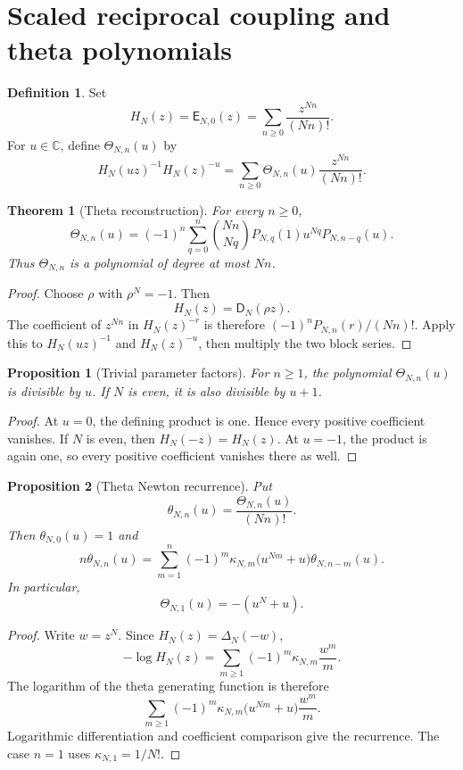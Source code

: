 \documentclass{aomart}
\newtheorem{theorem}{Theorem}[section]
\newtheorem{proposition}[proposition]{Proposition}
\theoremstyle{definition}
\newtheorem{definition}[definition]{Definition}
\theoremstyle{remark}
\newcommand{\CC}{\mathbb C}
\newcommand{\Dfun}{\mathsf D}
\newcommand{\Efun}{\mathsf E}
\newcommand{\Thetafun}{\mathsf\Theta}
\begin{document}
\section{Scaled reciprocal coupling and theta polynomials}\label{sec:theta}

\begin{definition}\label{def:unsigned_denominator}
Set
\[
H_N(z)=\Efun_{N,0}(z)
=
\sum_{n\geq0}\frac{z^{Nn}}{(Nn)!}.
\]
For $u\in\CC$, define $\Thetafun_{N,n}(u)$ by
\[
H_N(uz)^{-1}H_N(z)^{-u}
=
\sum_{n\geq0}\Thetafun_{N,n}(u)\frac{z^{Nn}}{(Nn)!}.
\]
\end{definition}

\begin{theorem}[Theta reconstruction]\label{thm:theta_reconstruction}
For every $n\geq0$,
\[
\Thetafun_{N,n}(u)
=
(-1)^n
\sum_{q=0}^{n}
\binom{Nn}{Nq}
P_{N,q}(1)u^{Nq}P_{N,n-q}(u).
\]
Thus $\Thetafun_{N,n}$ is a polynomial of degree at most $Nn$.
\end{theorem}

\begin{proof}
Choose $\rho$ with $\rho^N=-1$.  Then
\[
H_N(z)=\Dfun_N(\rho z).
\]
The coefficient of $z^{Nn}$ in $H_N(z)^{-r}$ is therefore $(-1)^nP_{N,n}(r)/(Nn)!$.  Apply this to $H_N(uz)^{-1}$ and $H_N(z)^{-u}$, then multiply the two block series.
\end{proof}

\begin{proposition}[Trivial parameter factors]\label{prop:theta_factors}
For $n\geq1$, the polynomial $\Thetafun_{N,n}(u)$ is divisible by $u$.  If $N$ is even, it is also divisible by $u+1$.
\end{proposition}

\begin{proof}
At $u=0$, the defining product is one.  Hence every positive coefficient vanishes.  If $N$ is even, then $H_N(-z)=H_N(z)$.  At $u=-1$, the product is again one, so every positive coefficient vanishes there as well.
\end{proof}


\begin{proposition}[Theta Newton recurrence]\label{prop:theta_newton_recurrence}
Put
\[
\theta_{N,n}(u)=\frac{\Thetafun_{N,n}(u)}{(Nn)!}.
\]
Then $\theta_{N,0}(u)=1$ and
\[
n\theta_{N,n}(u)
=
\sum_{m=1}^{n}
(-1)^m\kappa_{N,m}
\bigl(u^{Nm}+u\bigr)
\theta_{N,n-m}(u).
\]
In particular,
\[
\Thetafun_{N,1}(u)=-(u^N+u).
\]
\end{proposition}

\begin{proof}
Write $w=z^N$.  Since $H_N(z)=\Delta_N(-w)$,
\[
-\log H_N(z)
=
\sum_{m\geq1}(-1)^m\kappa_{N,m}\frac{w^m}{m}.
\]
The logarithm of the theta generating function is therefore
\[
\sum_{m\geq1}
(-1)^m\kappa_{N,m}
\bigl(u^{Nm}+u\bigr)
\frac{w^m}{m}.
\]
Logarithmic differentiation and coefficient comparison give the recurrence.  The case $n=1$ uses $\kappa_{N,1}=1/N!$.
\end{proof}
\end{document}
